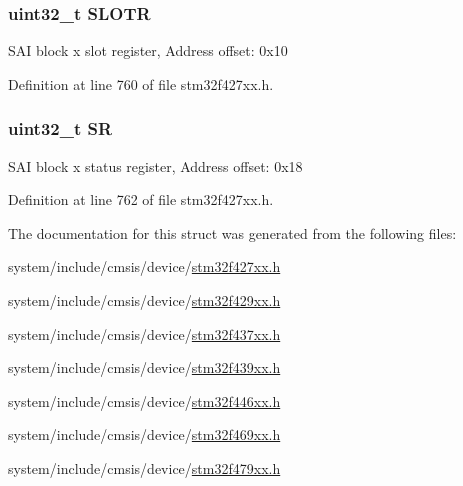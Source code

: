 \subsubsection[{\texorpdfstring{S\+L\+O\+TR}{SLOTR}}]{ uint32\+\_\+t S\+L\+O\+TR}\hypertarget{struct_s_a_i___block___type_def_ad30f20f612dacf85a5bb7f9f97cf0772}{}\label{struct_s_a_i___block___type_def_ad30f20f612dacf85a5bb7f9f97cf0772}
S\+AI block x slot register, Address offset\+: 0x10 

Definition at line 760 of file stm32f427xx.\+h.

\subsubsection[{\texorpdfstring{SR}{SR}}]{ uint32\+\_\+t SR}\hypertarget{struct_s_a_i___block___type_def_af6aca2bbd40c0fb6df7c3aebe224a360}{}\label{struct_s_a_i___block___type_def_af6aca2bbd40c0fb6df7c3aebe224a360}
S\+AI block x status register, Address offset\+: 0x18 

Definition at line 762 of file stm32f427xx.\+h.



The documentation for this struct was generated from the following files\+:\begin{DoxyCompactItemize}
\item 
system/include/cmsis/device/\hyperlink{stm32f427xx_8h}{stm32f427xx.\+h}\item 
system/include/cmsis/device/\hyperlink{stm32f429xx_8h}{stm32f429xx.\+h}\item 
system/include/cmsis/device/\hyperlink{stm32f437xx_8h}{stm32f437xx.\+h}\item 
system/include/cmsis/device/\hyperlink{stm32f439xx_8h}{stm32f439xx.\+h}\item 
system/include/cmsis/device/\hyperlink{stm32f446xx_8h}{stm32f446xx.\+h}\item 
system/include/cmsis/device/\hyperlink{stm32f469xx_8h}{stm32f469xx.\+h}\item 
system/include/cmsis/device/\hyperlink{stm32f479xx_8h}{stm32f479xx.\+h}\end{DoxyCompactItemize}
